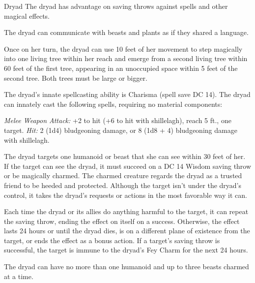 \documentclass[10pt,a4paper,twoside,twocolumn,openany,nodeprecatedcode]{dndbook}
\begin{document}
\begin{DndMonster}[float=ht]{Dryad}
\DndMonsterBasics[
armor-class = {11 (16 with barkskin)},
hit-points = {\DndDice{5d8}},
speed = {30 ft.}
]
\DndMonsterAbilityScores[
 str = 10,
 dex = 12,
 con = 11,
 int = 14,
 wis = 15,
 cha = 18
]
\DndMonsterDetails[
skills = {Perception +4, Stealth +5},
senses = {darkvision 60 ft., passive perception 14},
languages = {Elvish, Sylvan},
challenge = 1,
]
The dryad has advantage on saving throws against spells and other magical effects.

The dryad can communicate with beasts and plants as if they shared a language.

Once on her turn, the dryad can use 10 feet of her movement to step magically into one living tree within her reach and emerge from a second living tree within 60 feet of the first tree, appearing in an unoccupied space within 5 feet of the second tree. Both trees must be large or bigger.

The dryad's innate spellcasting ability is Charisma (spell save DC 14). The dryad can innately cast the following spells, requiring no material components:
\begin{DndMonsterSpells}
\end{DndMonsterSpells}
\par
{}
\textsl{Melee Weapon Attack:} +2 to hit (+6 to hit with shillelagh), reach 5 ft., one target. \textsl{Hit:} 2 (1d4) bludgeoning damage, or 8 (1d8 + 4) bludgeoning damage with shillelagh.

The dryad targets one humanoid or beast that she can see within 30 feet of her. If the target can see the dryad, it must succeed on a DC 14 Wisdom saving throw or be magically charmed. The charmed creature regards the dryad as a trusted friend to be heeded and protected. Although the target isn't under the dryad's control, it takes the dryad's requests or actions in the most favorable way it can.

Each time the dryad or its allies do anything harmful to the target, it can repeat the saving throw, ending the effect on itself on a success. Otherwise, the effect lasts 24 hours or until the dryad dies, is on a different plane of existence from the target, or ends the effect as a bonus action. If a target's saving throw is successful, the target is immune to the dryad's Fey Charm for the next 24 hours.

The dryad can have no more than one humanoid and up to three beasts charmed at a time.

\end{DndMonster}
\end{document}
